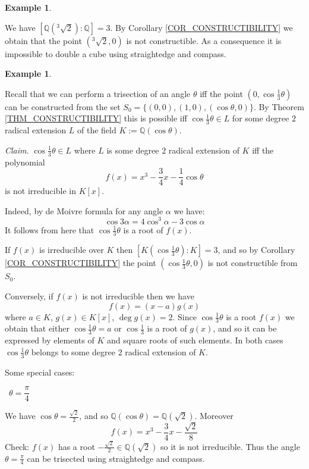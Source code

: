 \documentclass[12pt, letterpaper, oneside]{article}
\theoremstyle{plain}
\theoremstyle{definition}
\newtheorem{example}[theorem]{Example}
\newcommand{\Q}{{\mathbb Q}}
\newcommand{\vs}{\vskip 5mm}
\begin{document}
\vs\vs

\begin{example} \ 

We have  $[\Q(^{3}\!\!\!\sqrt{2}): \Q] = 3$. By Corollary \ref{COR_CONSTRUCTIBILITY}
we obtain that the point $( ^{3}\!\!\!\sqrt{2}, 0)$ is not constructible. As a consequence 
it is impossible to double a cube  using straightedge and compass.  

\end{example}


\vs\vs

\begin{example} \ 

Recall that we can perform a trisection of an angle $\theta$ iff the point $(0, \cos \frac{1}{3}\theta)$
can be constructed from the set $S_{0} = \{(0, 0), (1, 0), (\cos\theta, 0)\}$. 
By Theorem \ref{THM_CONSTRUCTIBILITY}  this is possible iff $\cos\frac{1}{3}\theta \in L$
for some degree $2$ radical extension $L$ of the field $K:= \Q(\cos\theta)$. 

\vs 

\emph{Claim.} $\cos\frac{1}{3}\theta \in L$ where $L$ is some degree $2$ radical extension of 
$K$ iff the polynomial 
$$f(x) = x^{3} -\frac{3}{4}x -\frac{1}{4}\cos \theta$$
is not irreducible in $K[x]$. 

Indeed, by de Moivre formula for any angle $\alpha$ we have:
$$\cos 3\alpha = 4 \cos^{3}\alpha -3\cos\alpha$$
It follows from here that $\cos\frac{1}{3}\theta$ is a root of $f(x)$. 

If $f(x)$ is irreducible over $K$ then $[K(\cos\frac{1}{3}\theta):K] =3$,
and so by Corollary  \ref{COR_CONSTRUCTIBILITY} the point $(\cos \frac{1}{3}\theta, 0)$
is not constructible from $S_{0}$. 


Conversely, if $f(x)$ is not irreducible then we have 
$$f(x) = (x-a)g(x)$$
where $a\in K$, $g(x) \in K[x]$, $\deg g(x) =2$. Since $\cos \frac{1}{3}\theta$ is a root 
$f(x)$ we obtain that either $\cos\frac{1}{3}\theta = a$ or $\cos\frac{1}{3}$ is a root of $g(x)$,
and so it can be expressed by elements of $K$ and square roots of such elements.  
In both cases $\cos\frac{1}{3}\theta$ belongs to some degree $2$ radical extension of $K$. 

\vs

Some special cases:

\textbullet \ $\theta = \dfrac{\pi}{4}$

We have $\cos\theta = \frac{\sqrt{2}}{2}$, and so $\Q(\cos \theta) = \Q(\sqrt{2})$. Moreover
$$f(x) = x^{3} -\frac{3}{4}x - \frac{\sqrt{2}}{8}$$
Check: $f(x)$ has a root $-\frac{\sqrt{2}}{2} \in \Q(\sqrt{2})$ so it is not irreducible. Thus 
the angle $\theta = \frac{\pi}{4}$ can be trisected using straightedge and compass. 


\end{example}
\end{document}
